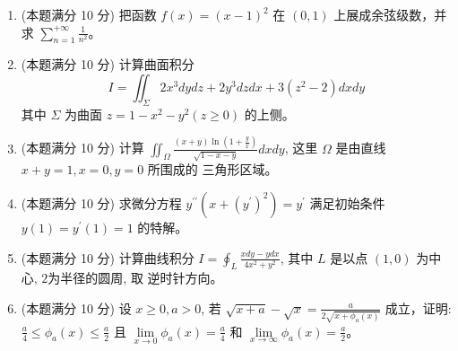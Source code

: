 \begin{enumerate}
\item 
(本题满分 10 分)
把函数 $f(x)=(x-1)^{2}$ 在 $(0,1)$ 上展成余弦级数，并求 $\sum\limits_{n=1}^{+\infty} \frac{1}{n^{2}}$。




\item 
(本题满分 10 分)
计算曲面积分
\[
I=\iint_{\Sigma} 2 x^{3} d y d z+2 y^{3} d z d x+3\left(z^{2}-2\right) d x d y
\]
其中 $\Sigma$ 为曲面 $z=1-x^{2}-y^{2}(z \geqslant 0)$ 的上侧。





\item 
(本题满分 10 分)
计算 $\iint_{\Omega} \frac{(x+y) \ln \left(1+\frac{y}{x}\right)}{\sqrt{1-x-y}} d x d y$, 这里 $\Omega$ 是由直线 $x+y=1, x=0, y=0$ 所围成的 三角形区域。



\newpage
\item 
(本题满分 10 分)
求微分方程 $y^{\prime \prime}\left(x+\left(y^{\prime}\right)^{2} \right)=y^{\prime}$ 满足初始条件 $y(1)=y^{\prime}(1)=1$ 的特解。




\item 
(本题满分 10 分)
计算曲线积分 $I=\oint_{L} \frac{x d y-y d x}{4 x^{2}+y^{2}}$, 其中 $L$ 是以点 $(1,0)$ 为中心, $ 2  $为半径的圆周, 取 逆时针方向。




\item 
(本题满分 10 分)
设 $x \geqslant 0, a>0$, 若 $\sqrt{x+a}-\sqrt{x}=\frac{a}{2 \sqrt{x+\phi_{a}(x)}}$ 成立，证明: $\frac{a}{4} \leqslant \phi_{a}(x) \leqslant \frac{a}{2}$ 且 $\lim\limits _{x \rightarrow 0} \phi_{a}(x)=\frac{a}{4}$ 和 $\lim\limits _{x \rightarrow \infty} \phi_{a}(x)=\frac{a}{2}$。




\end{enumerate}
